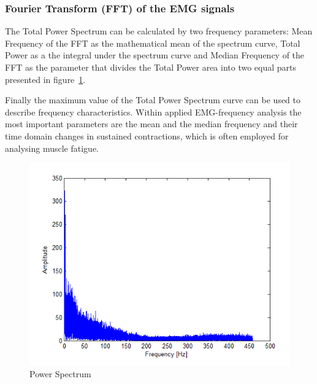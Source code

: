 \documentclass[conference]{IEEEtran}
\begin{document}
\subsubsection{Fourier Transform (FFT) of the EMG signals} \label{sub:FourierTransform(FFT)oftheEMGsignals}
\par The Total Power Spectrum can be calculated by two frequency parameters: Mean Frequency of the FFT as the mathematical mean of the spectrum curve, Total Power as a the integral under the spectrum curve and Median Frequency of the FFT as the parameter that divides the Total Power area into two equal parts~\cite{Konrad} presented in figure~\ref{fig:spectre}. \par
Finally the maximum value of the Total Power Spectrum curve can be used to describe frequency characteristics. Within applied EMG-frequency analysis the most important parameters are the mean and the median frequency and their time domain changes in sustained contractions, which is often employed for analysing muscle fatigue.\par

\begin{figure}
    \hspace*{1.2 cm}
    \includegraphics[scale=0.40]{fig4.png}
    \caption{Power Spectrum}
    \label{fig:spectre}
\end{figure}


\end{document}
